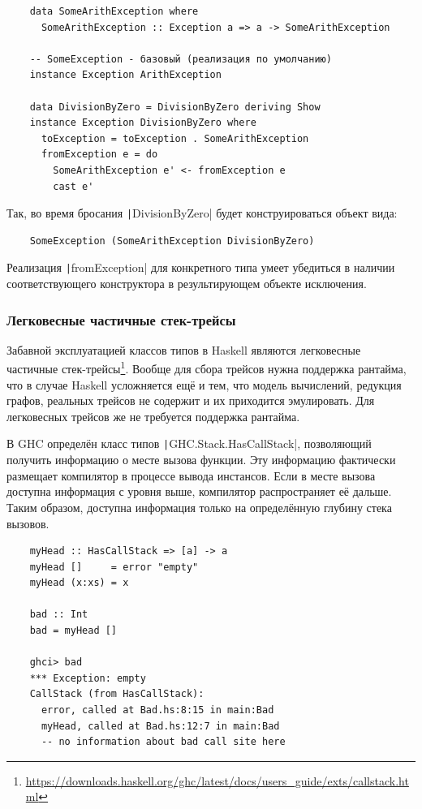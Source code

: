 \begin{verbatim}
    data SomeArithException where
      SomeArithException :: Exception a => a -> SomeArithException

    -- SomeException - базовый (реализация по умолчанию)
    instance Exception ArithException

    data DivisionByZero = DivisionByZero deriving Show
    instance Exception DivisionByZero where
      toException = toException . SomeArithException
      fromException e = do
        SomeArithException e' <- fromException e
        cast e'
\end{verbatim}

Так, во время бросания \texttt|DivisionByZero| будет конструироваться объект вида:
\begin{verbatim}
    SomeException (SomeArithException DivisionByZero)
\end{verbatim}
Реализация \texttt|fromException| для конкретного типа умеет убедиться в наличии соответствующего конструктора в результирующем объекте исключения.

\subsubsection{Легковесные частичные стек-трейсы}

Забавной эксплуатацией классов типов в Haskell являются легковесные частичные стек-трейсы\footnote{\url{https://downloads.haskell.org/ghc/latest/docs/users_guide/exts/callstack.html}}.
Вообще для сбора трейсов нужна поддержка рантайма, что в случае Haskell усложняется ещё и тем, что модель вычислений, редукция графов, реальных трейсов не содержит и их приходится эмулировать.
Для легковесных трейсов же не требуется поддержка рантайма.

В GHC определён класс типов \texttt|GHC.Stack.HasCallStack|, позволяющий получить информацию о месте вызова функции.
Эту информацию фактически размещает компилятор в процессе вывода инстансов.
Если в месте вызова доступна информация с уровня выше, компилятор распространяет её дальше.
Таким образом, доступна информация только на определённую глубину стека вызовов.
\begin{verbatim}
    myHead :: HasCallStack => [a] -> a
    myHead []     = error "empty"
    myHead (x:xs) = x

    bad :: Int
    bad = myHead []

    ghci> bad
    *** Exception: empty
    CallStack (from HasCallStack):
      error, called at Bad.hs:8:15 in main:Bad
      myHead, called at Bad.hs:12:7 in main:Bad
      -- no information about bad call site here
\end{verbatim}

